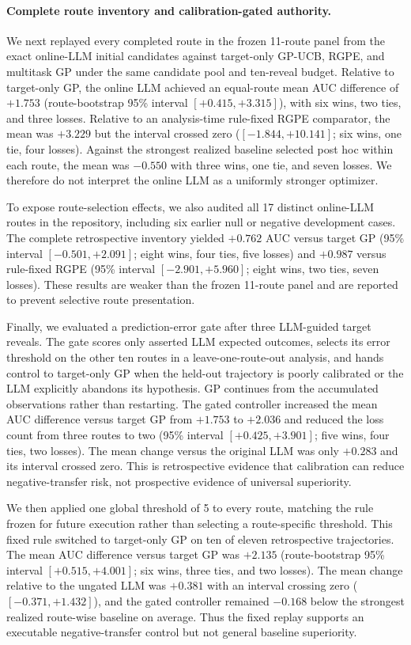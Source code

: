 \paragraph{Complete route inventory and calibration-gated authority.}
We next replayed every completed route in the frozen 11-route panel from the
exact online-LLM initial candidates against target-only GP-UCB, RGPE, and
multitask GP under the same candidate pool and ten-reveal budget. Relative to
target-only GP, the online LLM achieved an equal-route mean AUC difference of
$+1.753$ (route-bootstrap 95\% interval $[+0.415,+3.315]$), with six wins, two
ties, and three losses. Relative to an analysis-time rule-fixed RGPE
comparator, the mean was $+3.229$ but the interval crossed zero
($[-1.844,+10.141]$; six wins, one tie, four losses). Against the strongest
realized baseline selected post hoc within each route, the mean was $-0.550$
with three wins, one tie, and seven losses. We therefore do not interpret the
online LLM as a uniformly stronger optimizer.

To expose route-selection effects, we also audited all 17 distinct online-LLM
routes in the repository, including six earlier null or negative development
cases. The complete retrospective inventory yielded $+0.762$ AUC versus target
GP (95\% interval $[-0.501,+2.091]$; eight wins, four ties, five losses) and
$+0.987$ versus rule-fixed RGPE (95\% interval $[-2.901,+5.960]$; eight wins,
two ties, seven losses). These results are weaker than the frozen 11-route
panel and are reported to prevent selective route presentation.

Finally, we evaluated a prediction-error gate after three LLM-guided target
reveals. The gate scores only asserted LLM expected outcomes, selects its error
threshold on the other ten routes in a leave-one-route-out analysis, and hands
control to target-only GP when the held-out trajectory is poorly calibrated or
the LLM explicitly abandons its hypothesis. GP continues from the accumulated
observations rather than restarting. The gated controller increased the mean
AUC difference versus target GP from $+1.753$ to $+2.036$ and reduced the loss
count from three routes to two (95\% interval $[+0.425,+3.901]$; five wins,
four ties, two losses). The mean change versus the original LLM was only
$+0.283$ and its interval crossed zero. This is retrospective evidence that
calibration can reduce negative-transfer risk, not prospective evidence of
universal superiority.

We then applied one global threshold of 5 to every route, matching the rule
frozen for future execution rather than selecting a route-specific threshold.
This fixed rule switched to target-only GP on ten of eleven retrospective
trajectories. The mean AUC difference versus target GP was $+2.135$
(route-bootstrap 95\% interval $[+0.515,+4.001]$; six wins, three ties, and two
losses). The mean change relative to the ungated LLM was $+0.381$ with an
interval crossing zero ($[-0.371,+1.432]$), and the gated controller remained
$-0.168$ below the strongest realized route-wise baseline on average. Thus the
fixed replay supports an executable negative-transfer control but not general
baseline superiority.

